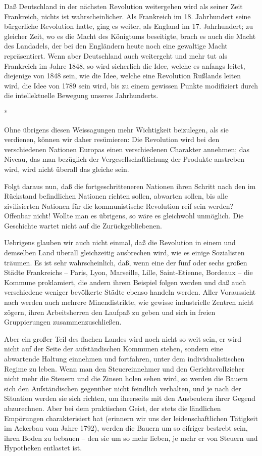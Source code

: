 \documentclass{scrbook}
\begin{document}
Daß Deutschland in der nächsten Revolution weitergehen wird als seiner Zeit Frankreich, nichts ist wahrscheinlicher. Als Frankreich im 18. Jahrhundert seine bürgerliche Revolution hatte, ging es weiter, als England im 17. Jahrhundert; zu gleicher Zeit, wo es die Macht des Königtums beseitigte, brach es auch die Macht des Landadels, der bei den Engländern heute noch eine gewaltige Macht repräsentiert. Wenn aber Deutschland auch weitergeht und mehr tut als Frankreich im Jahre 1848, so wird sicherlich die Idee, welche es anfangs leitet, diejenige von 1848 sein, wie die Idee, welche eine Revolution Rußlands leiten wird, die Idee von 1789 sein wird, bis zu einem gewissen Punkte modifiziert durch die intellektuelle Bewegung unseres Jahrhunderts.

\begin{center}*\end{center}

Ohne übrigens diesen Weissagungen mehr Wichtigkeit beizulegen, als sie verdienen, können wir daher resümieren: Die Revolution wird bei den verschiedenen Nationen Europas einen verschiedenen Charakter annehmen; das Niveau, das man bezüglich der Vergesellschaftlichung der Produkte anstreben wird, wird nicht überall das gleiche sein.

Folgt daraus nun, daß die fortgeschritteneren Nationen ihren Schritt nach den im Rückstand befindlichen Nationen richten sollen, abwarten sollen, bis alle zivilisierten Nationen für die kommunistische Revolution reif sein werden? Offenbar nicht! Wollte man es übrigens, so wäre es gleichwohl unmöglich. Die Geschichte wartet nicht auf die Zurückgebliebenen.

Uebrigens glauben wir auch nicht einmal, daß die Revolution in einem und demselben Land überall gleichzeitig ausbrechen wird, wie es einige Sozialisten träumen. Es ist sehr wahrscheinlich, daß, wenn eine der fünf oder sechs großen Städte Frankreichs – Paris‚ Lyon, Marseille, Lille, Saint-Etienne, Bordeaux – die Kommune proklamiert, die andern ihrem Beispiel folgen werden und daß auch verschiedene weniger bevölkerte Städte ebenso handeln werden. Aller Voraussicht nach werden auch mehrere Minendistrikte, wie gewisse industrielle Zentren nicht zögern, ihren Arbeitsherren den Laufpaß zu geben und sich in freien Gruppierungen zusammenzuschließen.

Aber ein großer Teil des flachen Landes wird noch nicht so weit sein, er wird nicht auf der Seite der aufständischen Kommunen stehen, sondern eine abwartende Haltung einnehmen und fortfahren, unter dem individualistischen Regime zu leben. Wenn man den Steuereinnehmer und den Gerichtsvollzieher nicht mehr die Steuern und die Zinsen holen sehen wird, so werden die Bauern sich den Aufständischen gegenüber nicht feindlich verhalten, und je nach der Situation werden sie sich richten, um ihrerseits mit den Ausbeutern ihrer Gegend abzurechnen. Aber bei dem praktischen Geist, der stets die ländlichen Empörungen charakterisiert hat (erinnern wir uns der leidenschaftlichen Tätigkeit im Ackerbau vom Jahre 1792), werden die Bauern um so eifriger bestrebt sein, ihren Boden zu bebauen – den sie um so mehr lieben, je mehr er von Steuern und Hypotheken entlastet ist.
\end{document}
